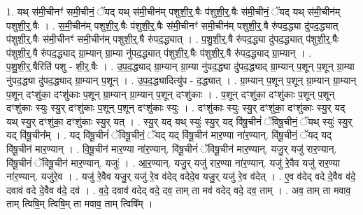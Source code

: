 \documentclass[17pt]{extarticle}
\begin{document}
1. यथ् स॑मी॒चीनꣳ॑ समी॒चीनं॒ ॅयद् यथ् स॑मी॒चीन॑म् पशुशी॒र्॒.षैः प॑शुशी॒र्॒.षैः स॑मी॒चीनं॒ ॅयद् यथ् स॑मी॒चीन॑म् पशुशी॒र्॒.षैः । . स॒मी॒चीन॑म् पशुशी॒र्॒.षैः प॑शुशी॒र्॒.षैः स॑मी॒चीनꣳ॑ समी॒चीन॑म् पशुशी॒र्॒.षै रु॑पद॒द्ध्या दु॑पद॒द्ध्यात् प॑शुशी॒र्॒.षैः स॑मी॒चीनꣳ॑ समी॒चीन॑म् पशुशी॒र्॒.षै रु॑पद॒द्ध्यात् । . प॒शु॒शी॒र्॒.षै रु॑पद॒द्ध्या दु॑पद॒द्ध्यात् प॑शुशी॒र्॒.षैः प॑शुशी॒र्॒.षै रु॑पद॒द्ध्याद् ग्रा॒म्यान् ग्रा॒म्या नु॑पद॒द्ध्यात् प॑शुशी॒र्॒.षैः प॑शुशी॒र्॒.षै रु॑पद॒द्ध्याद् ग्रा॒म्यान् । . प॒शु॒शी॒र्॒.षैरिति॑ पशु - शी॒र्॒.षैः । . उ॒प॒द॒द्ध्याद् ग्रा॒म्यान् ग्रा॒म्या नु॑पद॒द्ध्या दु॑पद॒द्ध्याद् ग्रा॒म्यान् प॒शून् प॒शून् ग्रा॒म्या नु॑पद॒द्ध्या दु॑पद॒द्ध्याद् ग्रा॒म्यान् प॒शून् । . उ॒प॒द॒द्ध्यादित्यु॑प - द॒द्ध्यात् । . ग्रा॒म्यान् प॒शून् प॒शून् ग्रा॒म्यान् ग्रा॒म्यान् प॒शून् दꣳशु॑का॒ दꣳशु॑काः प॒शून् ग्रा॒म्यान् ग्रा॒म्यान् प॒शून् दꣳशु॑काः । . प॒शून् दꣳशु॑का॒ दꣳशु॑काः प॒शून् प॒शून् दꣳशु॑काः स्युः स्यु॒र् दꣳशु॑काः प॒शून् प॒शून् दꣳशु॑काः स्युः । . दꣳशु॑काः स्युः स्यु॒र् दꣳशु॑का॒ दꣳशु॑काः स्यु॒र् यद् यथ् स्यु॒र् दꣳशु॑का॒ दꣳशु॑काः स्यु॒र् यत् । . स्यु॒र् यद् यथ् स्युः॑ स्यु॒र् यद् वि॑षू॒चीनं॑ ॅविषू॒चीनं॒ ॅयथ् स्युः॑ स्यु॒र् यद् वि॑षू॒चीन᳚म् । . यद् वि॑षू॒चीनं॑ ॅविषू॒चीनं॒ ॅयद् यद् वि॑षू॒चीन॑ मार॒ण्या ना॑र॒ण्यान्. वि॑षू॒चीनं॒ ॅयद् यद् वि॑षू॒चीन॑ मार॒ण्यान् । . वि॒षू॒चीन॑ मार॒ण्या ना॑र॒ण्यान्. वि॑षू॒चीनं॑ ॅविषू॒चीन॑ मार॒ण्यान्. यजु॒र् यजु॑ रार॒ण्यान्. वि॑षू॒चीनं॑ ॅविषू॒चीन॑ मार॒ण्यान्. यजुः॑ । . आ॒र॒ण्यान्. यजु॒र् यजु॑ रार॒ण्या ना॑र॒ण्यान्. यजु॑ रे॒वैव यजु॑ रार॒ण्या ना॑र॒ण्यान्. यजु॑रे॒व । . यजु॑ रे॒वैव यजु॒र् यजु॑ रे॒व व॑देद् वदेदे॒व यजु॒र् यजु॑ रे॒व व॑देत् । . ए॒व व॑देद् वदे दे॒वैव व॑दे॒ दवाव॑ वदे दे॒वैव व॑दे॒ दव॑ । . व॒दे॒ दवाव॑ वदेद् वदे॒ दव॒ ताम् ता मव॑ वदेद् वदे॒ दव॒ ताम् । . अव॒ ताम् ता मवाव॒ ताम् त्विषि॒म् त्विषि॒म् ता मवाव॒ ताम् त्विषि᳚म् । \newline
\end{document}
